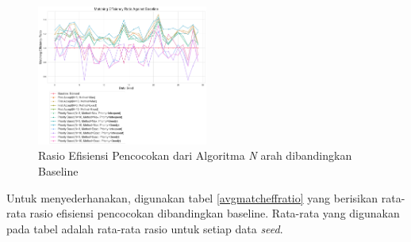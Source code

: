 \documentclass[conference]{IEEEtran}
\begin{document}
\begin{figure}[h]
    \includegraphics[width=0.5\textwidth]{images/matching_efficiency_ratio_against_baseline.png}
    \caption{Rasio Efisiensi Pencocokan dari Algoritma \textit{N} arah dibandingkan Baseline}
    \label{matcheffratio}
\end{figure}

Untuk menyederhanakan, digunakan tabel \ref{avgmatcheffratio} yang berisikan rata-rata rasio efisiensi pencocokan dibandingkan baseline. Rata-rata yang
digunakan pada tabel adalah rata-rata rasio untuk setiap data \textit{seed}.
\end{document}
